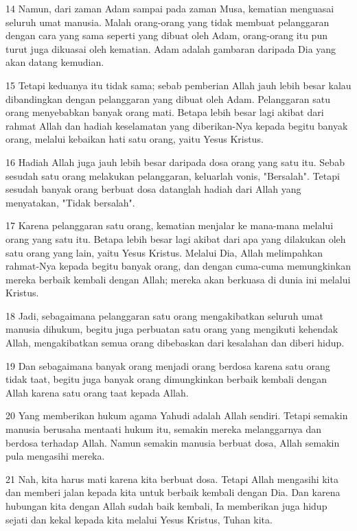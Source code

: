 \par 14 Namun, dari zaman Adam sampai pada zaman Musa, kematian menguasai seluruh umat manusia. Malah orang-orang yang tidak membuat pelanggaran dengan cara yang sama seperti yang dibuat oleh Adam, orang-orang itu pun turut juga dikuasai oleh kematian. Adam adalah gambaran daripada Dia yang akan datang kemudian.
\par 15 Tetapi keduanya itu tidak sama; sebab pemberian Allah jauh lebih besar kalau dibandingkan dengan pelanggaran yang dibuat oleh Adam. Pelanggaran satu orang menyebabkan banyak orang mati. Betapa lebih besar lagi akibat dari rahmat Allah dan hadiah keselamatan yang diberikan-Nya kepada begitu banyak orang, melalui kebaikan hati satu orang, yaitu Yesus Kristus.
\par 16 Hadiah Allah juga jauh lebih besar daripada dosa orang yang satu itu. Sebab sesudah satu orang melakukan pelanggaran, keluarlah vonis, "Bersalah". Tetapi sesudah banyak orang berbuat dosa datanglah hadiah dari Allah yang menyatakan, "Tidak bersalah".
\par 17 Karena pelanggaran satu orang, kematian menjalar ke mana-mana melalui orang yang satu itu. Betapa lebih besar lagi akibat dari apa yang dilakukan oleh satu orang yang lain, yaitu Yesus Kristus. Melalui Dia, Allah melimpahkan rahmat-Nya kepada begitu banyak orang, dan dengan cuma-cuma memungkinkan mereka berbaik kembali dengan Allah; mereka akan berkuasa di dunia ini melalui Kristus.
\par 18 Jadi, sebagaimana pelanggaran satu orang mengakibatkan seluruh umat manusia dihukum, begitu juga perbuatan satu orang yang mengikuti kehendak Allah, mengakibatkan semua orang dibebaskan dari kesalahan dan diberi hidup.
\par 19 Dan sebagaimana banyak orang menjadi orang berdosa karena satu orang tidak taat, begitu juga banyak orang dimungkinkan berbaik kembali dengan Allah karena satu orang taat kepada Allah.
\par 20 Yang memberikan hukum agama Yahudi adalah Allah sendiri. Tetapi semakin manusia berusaha mentaati hukum itu, semakin mereka melanggarnya dan berdosa terhadap Allah. Namun semakin manusia berbuat dosa, Allah semakin pula mengasihi mereka.
\par 21 Nah, kita harus mati karena kita berbuat dosa. Tetapi Allah mengasihi kita dan memberi jalan kepada kita untuk berbaik kembali dengan Dia. Dan karena hubungan kita dengan Allah sudah baik kembali, Ia memberikan juga hidup sejati dan kekal kepada kita melalui Yesus Kristus, Tuhan kita.

